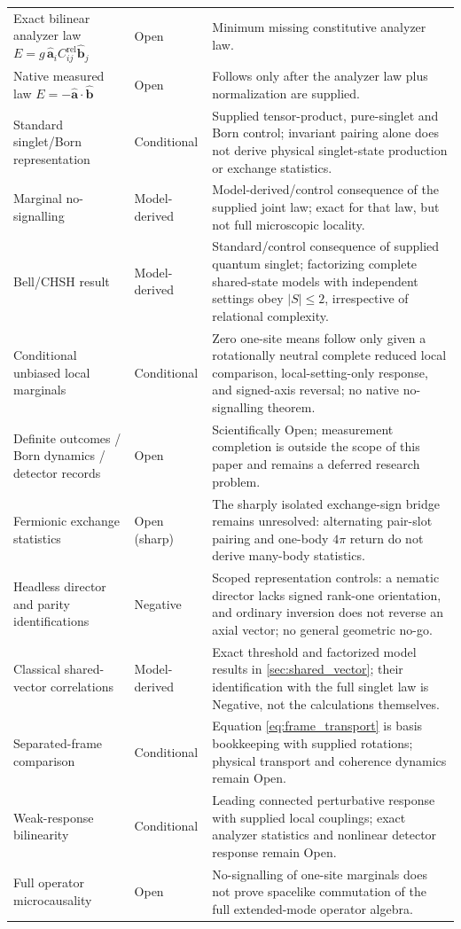 \documentclass[11pt]{article}
\theoremstyle{remark}
\newcommand{\ahat}{\hat{\bm a}}
\newcommand{\bhat}{\hat{\bm b}}
\newcommand{\Crel}{C^{\mathrm{rel}}}
\begin{document}
\begin{longtable}{P{5.0cm}P{3.6cm}P{6.2cm}}
Exact bilinear analyzer law
\(E=g\,\ahat_i\Crel_{ij}\bhat_j\) &
Open &
Minimum missing constitutive analyzer law.\\
Native measured law \(E=-\ahat\cdot\bhat\) & Open & Follows only after the analyzer law plus normalization are supplied.\\
Standard singlet/Born representation & Conditional & Supplied tensor-product, pure-singlet and Born control; invariant pairing alone does not derive physical singlet-state production or exchange statistics.\\
Marginal no-signalling & Model-derived & Model-derived/control consequence of the supplied joint law; exact for that law, but not full microscopic locality.\\
Bell/CHSH result & Model-derived & Standard/control consequence of supplied quantum singlet; factorizing complete shared-state models with independent settings obey \(|S|\leq2\), irrespective of relational complexity.\\
Conditional unbiased local marginals & Conditional & Zero one-site means follow only given a rotationally neutral complete reduced local comparison, local-setting-only response, and signed-axis reversal; no native no-signalling theorem.\\
Definite outcomes / Born dynamics / detector records & Open & Scientifically Open; measurement completion is outside the scope of this paper and remains a deferred research problem. \\
Fermionic exchange statistics & Open (sharp) & The sharply isolated exchange-sign bridge remains unresolved: alternating pair-slot pairing and one-body \(4\pi\) return do not derive many-body statistics.\\
Headless director and parity identifications & Negative & Scoped representation controls: a nematic director lacks signed rank-one orientation, and ordinary inversion does not reverse an axial vector; no general geometric no-go.\\
Classical shared-vector correlations & Model-derived & Exact threshold and factorized model results in \cref{sec:shared_vector}; their identification with the full singlet law is Negative, not the calculations themselves.\\
Separated-frame comparison & Conditional & Equation \eqref{eq:frame_transport} is basis bookkeeping with supplied rotations; physical transport and coherence dynamics remain Open.\\
Weak-response bilinearity & Conditional & Leading connected perturbative response with supplied local couplings; exact analyzer statistics and nonlinear detector response remain Open.\\
Full operator microcausality & Open & No-signalling of one-site marginals does not prove spacelike commutation of the full extended-mode operator algebra.\\
\bottomrule
\end{longtable}
\endgroup
\end{document}
